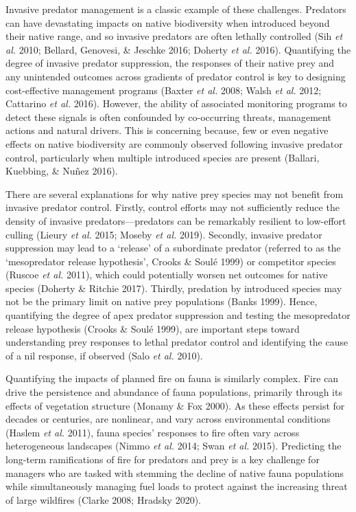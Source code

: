 \documentclass[11pt,a4paper,titlepage,twoside,openright]{style/unimelbthesis}
\begin{document}
\begin{mainmatter}
Invasive predator management is a classic example of these challenges. Predators can have devastating impacts on native biodiversity when introduced beyond their native range, and so invasive predators are often lethally controlled (Sih \emph{et al.} 2010; Bellard, Genovesi, \& Jeschke 2016; Doherty \emph{et al.} 2016). Quantifying the degree of invasive predator suppression, the responses of their native prey and any unintended outcomes across gradients of predator control is key to designing cost-effective management programs (Baxter \emph{et al.} 2008; Walsh \emph{et al.} 2012; Cattarino \emph{et al.} 2016). However, the ability of associated monitoring programs to detect these signals is often confounded by co-occurring threats, management actions and natural drivers. This is concerning because, few or even negative effects on native biodiversity are commonly observed following invasive predator control, particularly when multiple introduced species are present (Ballari, Kuebbing, \& Nuñez 2016).

There are several explanations for why native prey species may not benefit from invasive predator control. Firstly, control efforts may not sufficiently reduce the density of invasive predators---predators can be remarkably resilient to low-effort culling (Lieury \emph{et al.} 2015; Moseby \emph{et al.} 2019). Secondly, invasive predator suppression may lead to a `release' of a subordinate predator (referred to as the `mesopredator release hypothesis', Crooks \& Soulé 1999) or competitor species (Ruscoe \emph{et al.} 2011), which could potentially worsen net outcomes for native species (Doherty \& Ritchie 2017). Thirdly, predation by introduced species may not be the primary limit on native prey populations (Banks 1999). Hence, quantifying the degree of apex predator suppression and testing the mesopredator release hypothesis (Crooks \& Soulé 1999), are important steps toward understanding prey responses to lethal predator control and identifying the cause of a nil response, if observed (Salo \emph{et al.} 2010).

Quantifying the impacts of planned fire on fauna is similarly complex. Fire can drive the persistence and abundance of fauna populations, primarily through its effects of vegetation structure (Monamy \& Fox 2000). As these effects persist for decades or centuries, are nonlinear, and vary across environmental conditions (Haslem \emph{et al.} 2011), fauna species' responses to fire often vary across heterogeneous landscapes (Nimmo \emph{et al.} 2014; Swan \emph{et al.} 2015). Predicting the long-term ramifications of fire for predators and prey is a key challenge for managers who are tasked with stemming the decline of native fauna populations while simultaneously managing fuel loads to protect against the increasing threat of large wildfires (Clarke 2008; Hradsky 2020).


\end{mainmatter}
\end{document}
